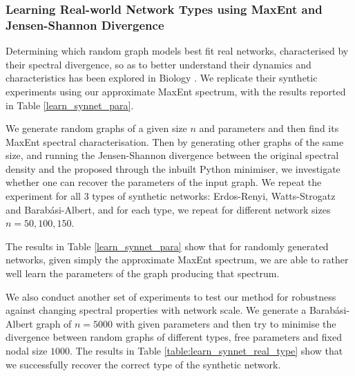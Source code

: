 \documentclass{article}
\begin{document}
\subsubsection{Learning Real-world Network Types using MaxEnt and Jensen-Shannon Divergence}
Determining which random graph models best fit real networks, characterised by their spectral divergence, so as to better understand their dynamics and characteristics has been explored in Biology \citep{takahashi2012discriminating}. We replicate their synthetic experiments using our approximate MaxEnt spectrum, with the results reported in Table \ref{learn_synnet_para}. 

We generate random graphs of a given size $n$ and parameters and then find its MaxEnt spectral characterisation. Then by generating other graphs of the same size, and running the Jensen-Shannon divergence between the original spectral density and the proposed through the inbuilt Python minimiser, we investigate whether one can recover the parameters of the input graph. We repeat the experiment for all 3 types of synthetic networks: Erdos-Renyi, Watts-Strogatz and Barabási-Albert, and for each type, we repeat for different network sizes $n = 50, 100, 150$. 

The results in Table \ref{learn_synnet_para} show that for randomly generated networks, given simply the approximate MaxEnt spectrum, we are able to rather well learn the parameters of the graph producing that spectrum. 

We also conduct another set of experiments to test our method for robustness against changing spectral properties with network scale. We generate a Barabási-Albert graph of $n=5000$ with given parameters and then try to minimise the divergence between random graphs of different types, free parameters and fixed nodal size $1000$. The results in Table \ref{table:learn_synnet_real_type} show that we successfully recover the correct type of the synthetic network. 
\end{document}

